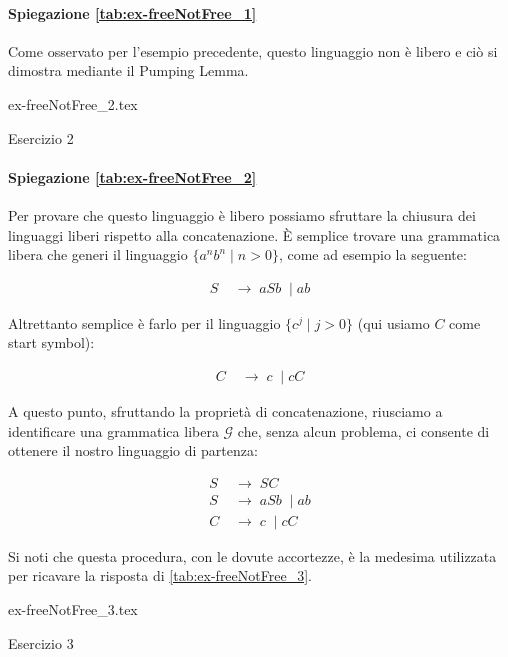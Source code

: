 \documentclass[class=book, crop=false, oneside, 12pt]{standalone}
\begin{document}
\paragraph{Spiegazione \ref{tab:ex-freeNotFree_1}}
Come osservato per l'esempio precedente, questo linguaggio non è libero e ciò si dimostra mediante il Pumping Lemma. 

\begin{table}[H]
	\centering
	{ex-freeNotFree_2.tex}
    \caption{Esercizio 2}
    \label{tab:ex-freeNotFree_2}
\end{table}

\paragraph{Spiegazione \ref{tab:ex-freeNotFree_2}}
Per provare che questo linguaggio è libero possiamo sfruttare la chiusura dei linguaggi liberi rispetto alla concatenazione. È semplice trovare una grammatica libera che generi il linguaggio \( \{ a^nb^n \mid n > 0 \} \), come ad esempio la seguente:

\begin{align*}
  S\; & \to\; aSb\; \mid ab
\end{align*}

\noindent Altrettanto semplice è farlo per il linguaggio \( \{ c^j \mid j > 0 \} \) (qui usiamo \(C\) come start symbol):

\begin{align*}
  C\; & \to\; c\; \mid cC
\end{align*}

\noindent A questo punto, sfruttando la proprietà di concatenazione, riusciamo a identificare una grammatica libera \(\mathcal{G}\) che, senza alcun problema, ci consente di ottenere il nostro linguaggio di partenza:

\begin{align*}
  S\; & \to\; SC \\
  S\; & \to\; aSb\; \mid ab \\
  C\; & \to\; c\; \mid cC
\end{align*}

\noindent Si noti che questa procedura, con le dovute accortezze, è la medesima utilizzata per ricavare la risposta di \ref{tab:ex-freeNotFree_3}.

\begin{table}[H]
	\centering
	{ex-freeNotFree_3.tex}
    \caption{Esercizio 3}
    \label{tab:ex-freeNotFree_3}
\end{table}
\end{document}
